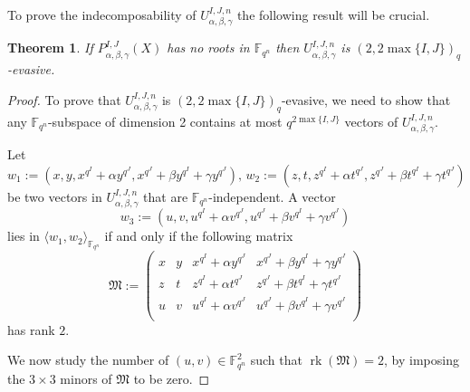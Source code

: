 \documentclass[11pt]{article}
\newtheorem{theorem}[theo]{Theorem}
\theoremstyle{definition}
\numberwithin{equation}{section}
\DeclareMathOperator{\rk}{rk}
\begin{document}
To prove the indecomposability of $U_{\alpha, \beta, \gamma}^{I,J,n}$ the following result will be crucial. 
\begin{theorem}
\label{thm:evasive}
If  $P^{I,J}_{\alpha,\beta,\gamma}(X)$ has no roots in $\mathbb{F}_{q^n}$ then $U_{\alpha, \beta, \gamma}^{I,J,n}$ is $(2,2\max\{I,J\})_q $-evasive. 
\end{theorem}

\begin{proof}
To prove that $U_{\alpha, \beta, \gamma}^{I,J,n}$ is $(2,2\max\{I,J\})_q $-evasive, we need to show that any $\mathbb{F}_{q^n}$-subspace of dimension 2 contains at most $q^{2\max\{I,J\}}$ vectors of $U_{\alpha, \beta, \gamma}^{I,J,n}$.

Let 
{\small \[w_1:=\left(x,y,x^{q^I}+\alpha y^{q^J},x^{q^J}+\beta y^{q^I} + \gamma y^{q^J}\right), \, w_2:=\left(z,t,z^{q^I}+\alpha t^{q^J},z^{q^J}+\beta t^{q^I} + \gamma t^{q^J}\right)\] }
be two vectors in $U_{\alpha, \beta, \gamma}^{I,J,n}$ that are $\mathbb{F}_{q^n}$-independent. A vector 
\[w_3:=\left(u,v,u^{q^I}+\alpha v^{q^J},u^{q^J}+\beta v^{q^I} + \gamma v^{q^J}\right)\] 
lies in $\langle w_1,w_2\rangle_{\mathbb{F}_{q^n}}$ if and only if the following matrix 
\begin{equation*}
    \mathfrak{M}:=\begin{pmatrix}
    x & y & x^{q^I}+\alpha y^{q^J} & x^{q^J}+\beta y^{q^I} + \gamma y^{q^J}\\
    z & t & z^{q^I}+\alpha t^{q^J} & z^{q^J}+\beta t^{q^I} + \gamma t^{q^J}\\
    u & v & u^{q^I}+\alpha v^{q^J} & u^{q^J}+\beta v^{q^I} + \gamma v^{q^J}\\
    \end{pmatrix}
\end{equation*}  has rank $2$.

We now study the number of $(u,v)\in {\mathbb F}_{q^n}^2$ such that $\rk(\mathfrak{M})=2$, by imposing the $3\times 3$ minors of $\mathfrak{M}$ to be zero.


\end{proof}
\end{document}
